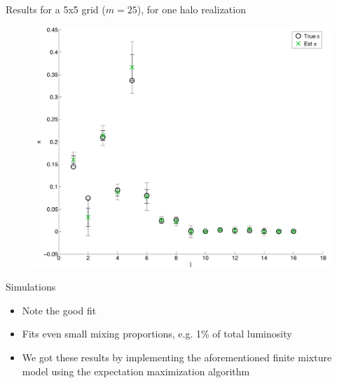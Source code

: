 \documentclass{beamer}
\begin{document}
\begin{frame}{Results for a 5x5 grid ($m=25$), for one halo realization}
	
	
	
	
	
	
	\begin{figure}
			\begin{center}
				\includegraphics[scale=0.3]{5x5eb.pdf}
			\end{center}
	\end{figure}
	
	
	
	
\end{frame}
\begin{frame}[shrink]{Simulations}
	
	\begin{itemize}
		\item Note the good fit
		\item Fits even small mixing proportions, e.g. 1\% of total luminosity
		\item We got these results by implementing the aforementioned finite mixture model using the expectation maximization algorithm
	\end{itemize}
	
\end{frame}
\end{document}
